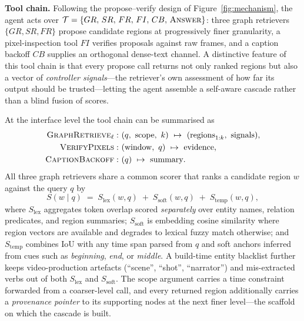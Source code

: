 \documentclass[sigconf, screen, review, anonymous]{acmart}
\begin{document}
\begin{sloppypar}
\textbf{Tool chain.}\quad
Following the propose--verify design of Figure~\ref{fig:mechanism}, the agent
acts over $\mathcal{T}=\{GR,\,SR,\,FR,\,FI,\,CB,\,\textsc{Answer}\}$: three
graph retrievers $\{GR,SR,FR\}$ propose candidate regions at progressively
finer granularity, a pixel-inspection tool $FI$ verifies proposals against
raw frames, and a caption backoff $CB$ supplies an orthogonal dense-text
channel.  A distinctive feature of this tool chain is that every propose
call returns not only ranked regions but also a vector of
\emph{controller signals}---the retriever's own assessment of how far its
output should be trusted---letting the agent assemble a self-aware cascade
rather than a blind fusion of scores.

At the interface level the tool chain can be summarised as
\begin{align*}
\textsc{GraphRetrieve}_{\ell}:\ &(q,\ \mathrm{scope},\ k)\ \mapsto\ (\mathrm{regions}_{1:k},\ \mathrm{signals}), \\
\textsc{VerifyPixels}:\ &(\mathrm{window},\ q)\ \mapsto\ \mathrm{evidence}, \\
\textsc{CaptionBackoff}:\ &(q)\ \mapsto\ \mathrm{summary}.
\end{align*}
All three graph retrievers share a common scorer that ranks a candidate
region $w$ against the query $q$ by
\begin{equation}
  S(w \mid q) \;=\; S_{\text{lex}}(w,q) \;+\;
  S_{\text{soft}}(w,q) \;+\; S_{\text{temp}}(w,q),
\end{equation}
where $S_{\text{lex}}$ aggregates token overlap scored \emph{separately} over
entity names, relation predicates, and region summaries; $S_{\text{soft}}$
is embedding cosine similarity where region vectors are available and
degrades to lexical fuzzy match otherwise; and $S_{\text{temp}}$ combines
IoU with any time span parsed from $q$ and soft anchors inferred from cues
such as \emph{beginning}, \emph{end}, or \emph{middle}.  A build-time
entity blacklist further keeps video-production artefacts (``scene'',
``shot'', ``narrator'') and mis-extracted verbs out of both $S_{\text{lex}}$
and $S_{\text{soft}}$.  The $\mathrm{scope}$ argument carries a time
constraint forwarded from a coarser-level call, and every returned region
additionally carries a \emph{provenance pointer} to its supporting nodes at
the next finer level---the scaffold on which the cascade is built.


\end{sloppypar}
\end{document}
